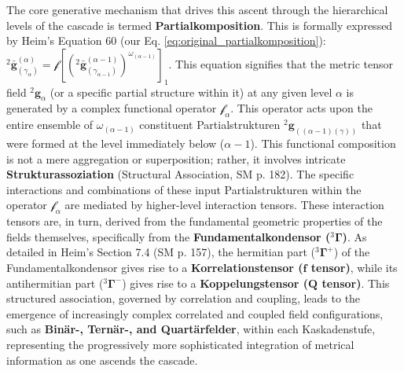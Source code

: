 \documentclass[12pt]{article}
\newcommand{\kompositionsfeld}{{}^2\mathbf{g}}
\newcommand{\partialstruktur}[1]{{}^2\mathbf{g}_{(#1)}} %
\newcommand{\fundamentalkondensor}{{}^3\bm{\Gamma}}
\newcommand{\korrelationstensor}{\mathbf{f}}
\newcommand{\koppelungstensor}{\mathbf{Q}}
\begin{document}
The core generative mechanism that drives this ascent through the hierarchical levels of the cascade is termed \textbf{Partialkomposition}. This is formally expressed by Heim's Equation 60 (our Eq. \eqref{eq:original_partialkomposition}): \( {}^{2}\bar{\mathbf{g}}^{(\alpha)}_{(\gamma_{\alpha})} = \mathcal{f} \left[ ({}^{2}\bar{\mathbf{g}}^{(\alpha-1)}_{(\gamma_{\alpha-1})})^{\omega_{(\alpha-1)}} \right]_1 \). This equation signifies that the metric tensor field \( \kompositionsfeld_\alpha \) (or a specific partial structure within it) at any given level \( \alpha \) is generated by a complex functional operator \( \mathcal{f}_\alpha \). This operator acts upon the entire ensemble of \( \omega_{(\alpha-1)} \) constituent Partialstrukturen \( \partialstruktur{(\alpha-1)(\gamma)} \) that were formed at the level immediately below (\( \alpha-1 \)). This functional composition is not a mere aggregation or superposition; rather, it involves intricate \textbf{Strukturassoziation} (Structural Association, SM p. 182). The specific interactions and combinations of these input Partialstrukturen within the operator \( \mathcal{f}_\alpha \) are mediated by higher-level interaction tensors. These interaction tensors are, in turn, derived from the fundamental geometric properties of the fields themselves, specifically from the \textbf{Fundamentalkondensor (\( \fundamentalkondensor \))}. As detailed in Heim's Section 7.4 (SM p. 157), the hermitian part (\( \fundamentalkondensor^+ \)) of the Fundamentalkondensor gives rise to a \textbf{Korrelationstensor (\( \korrelationstensor \) tensor)}, while its antihermitian part (\( \fundamentalkondensor^- \)) gives rise to a \textbf{Koppelungstensor (\( \koppelungstensor \) tensor)}. This structured association, governed by correlation and coupling, leads to the emergence of increasingly complex correlated and coupled field configurations, such as \textbf{Binär-, Ternär-, and Quartärfelder}, within each Kaskadenstufe, representing the progressively more sophisticated integration of metrical information as one ascends the cascade.
\end{document}
